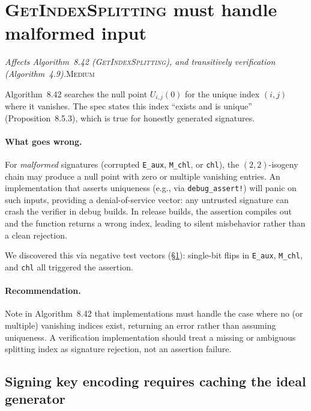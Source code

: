 \documentclass[a4paper,11pt]{article}
\newcommand{\algo}[1]{Algorithm~#1}
\newcommand{\medium}{\textsc{\color{RoyalBlue}Medium}}
\newcommand{\finding}[2]{\noindent\textit{#1}\hfill#2\par\smallskip}
\begin{document}
\section{\textsc{GetIndexSplitting} must handle malformed input}
\label{sec:splitting-panic}

\finding{Affects \algo{8.42}
(\textsc{GetIndexSplitting}), and transitively verification
(\algo{4.9}).}{\medium}

\algo{8.42} searches the null point $U_{i,j}(0)$ for the unique
index $(i,j)$ where it vanishes.  The spec states this index
``exists and is unique'' (Proposition~8.5.3), which is true for
honestly generated signatures.

\paragraph{What goes wrong.}
For \emph{malformed} signatures (corrupted \texttt{E\_aux},
\texttt{M\_chl}, or \texttt{chl}), the $(2,2)$-isogeny chain may
produce a null point with zero or multiple vanishing entries.
An implementation that asserts uniqueness (e.g., via
\texttt{debug\_assert!}) will panic on such inputs, providing a
denial-of-service vector: any untrusted signature can crash the
verifier in debug builds.  In release builds, the assertion compiles
out and the function returns a wrong index, leading to silent
misbehavior rather than a clean rejection.

We discovered this via negative test vectors
(\S\ref{sec:splitting-panic}): single-bit flips in
\texttt{E\_aux}, \texttt{M\_chl}, and \texttt{chl} all triggered
the assertion.

\paragraph{Recommendation.}
Note in \algo{8.42} that implementations must handle the case where
no (or multiple) vanishing indices exist, returning an error rather
than assuming uniqueness.  A verification implementation should treat
a missing or ambiguous splitting index as signature rejection, not an
assertion failure.

\subsection*{Signing key encoding requires caching the ideal generator}
\label{sec:sk-generator}
\end{document}
